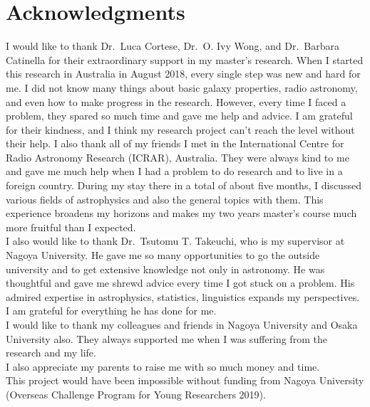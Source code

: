 \chapter*{\Large Acknowledgments}

I would like to thank Dr.\ Luca Cortese, Dr.\ O. Ivy Wong, and Dr.\ Barbara Catinella for their extraordinary support in my master's research.
When I started this research in Australia in August 2018, every single step was new and hard for me.
I did not know many things about basic galaxy properties, radio astronomy, and even how to make progress in the research.
However, every time I faced a problem, they spared so much time and gave me help and advice.
I am grateful for their kindness, and I think my research project can't reach the level without their help.
I also thank all of my friends I met in the International Centre for Radio Astronomy Research (ICRAR), Australia.
They were always kind to me and gave me much help when I had a problem to do research and to live in a foreign country.
During my stay there in a total of about five months, I discussed various fields of astrophysics and also the general topics with them.
This experience broadens my horizons and makes my two years master's course much more fruitful than I expected. \\
I also would like to thank Dr.\ Tsutomu T. Takeuchi, who is my supervisor at Nagoya University.
He gave me so many opportunities to go the outside university and to get extensive knowledge not only in astronomy.
He was thoughtful and gave me shrewd advice every time I got stuck on a problem.
His admired expertise in astrophysics, statistics, linguistics expands my perspectives.
I am grateful for everything he has done for me. \\
I would like to thank my colleagues and friends in Nagoya University and Osaka University also.
They always supported me when I was suffering from the research and my life. \\
I also appreciate my parents to raise me with so much money and time. \\
This project would have been impossible without funding from Nagoya University (Overseas Challenge Program for Young Researchers 2019).
